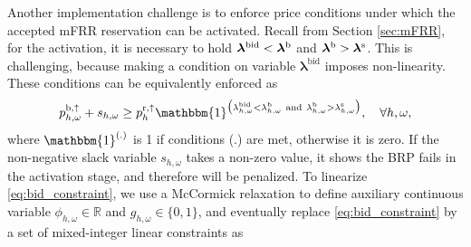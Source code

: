 Another implementation challenge is to enforce price conditions under which the accepted mFRR reservation can be activated. 
Recall from Section \ref{sec:mFRR}, for the activation, it is necessary to hold $ \bm{\lambda}^{\text{bid}} <  \bm{\lambda}^{\rm{b}}$ and $ \bm{\lambda}^{\rm{b}} > \bm{\lambda}^{\rm{s}}$. This is challenging, because making a condition on variable $ \bm{\lambda}^{\text{bid}}$ imposes non-linearity. These conditions can be equivalently enforced as
%
%
\begin{equation}\label{eq:bid_constraint}
    p^{\rm{b}, \uparrow}_{h,\omega} + s_{h,\omega} \geq p^{\rm{r},\uparrow}_{h}  \mathbbm{1}^{\big(\lambda^{\text{bid}}_{h,\omega} < \lambda^{\rm{b}}_{h,\omega} \ \text{and} \ \lambda^{\rm{b}}_{h,\omega} > \lambda^{\rm{s}}_{h,\omega}\big)}, \quad \forall{h,\omega},
\end{equation}
where $\mathbbm{1}^{(.)}$ is 1 if conditions (.) are met, otherwise it is zero. If the non-negative slack variable $s_{h,\omega}$ takes a non-zero value, it shows the BRP fails in the activation stage, and therefore will be penalized. To linearize \eqref{eq:bid_constraint}, we use a McCormick relaxation \cite{mccormick1976computability} to define auxiliary continuous variable $\phi_{h,\omega} \in \mathbb{R}$ and $g_{h,\omega} \in \{0, 1\}$, and eventually replace \eqref{eq:bid_constraint} by a set of mixed-integer linear constraints as
%
%
